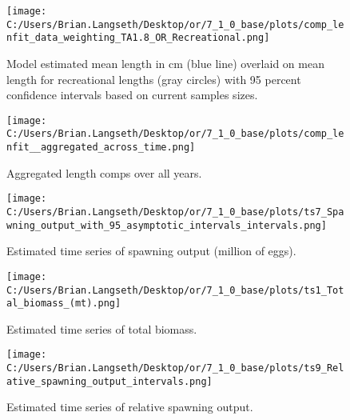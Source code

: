 \documentclass[11pt,
  english,
  a4paper,
]{article}
\begin{document}
\begin{figure}
\centering
\texttt{[image: C:/Users/Brian.Langseth/Desktop/or/7\_1\_0\_base/plots/comp\_lenfit\_data\_weighting\_TA1.8\_OR\_Recreational.png]}
\caption{Model estimated mean length in cm (blue line) overlaid on mean length for recreational lengths (gray circles) with 95 percent confidence intervals based on current samples sizes.\label{fig:rec-mean-len-fit}}
\end{figure}

\tagmcend\tagstructend


\begin{figure}
\centering
\texttt{[image: C:/Users/Brian.Langseth/Desktop/or/7\_1\_0\_base/plots/comp\_lenfit\_\_aggregated\_across\_time.png]}
\caption{Aggregated length comps over all years.\label{fig:agg-len-fit}}
\end{figure}

\tagmcend\tagstructend


\begin{figure}
\centering
\texttt{[image: C:/Users/Brian.Langseth/Desktop/or/7\_1\_0\_base/plots/ts7\_Spawning\_output\_with\_95\_asymptotic\_intervals\_intervals.png]}
\caption{Estimated time series of spawning output (million of eggs).\label{fig:ssb}}
\end{figure}

\tagmcend\tagstructend


\begin{figure}
\centering
\texttt{[image: C:/Users/Brian.Langseth/Desktop/or/7\_1\_0\_base/plots/ts1\_Total\_biomass\_(mt).png]}
\caption{Estimated time series of total biomass.\label{fig:tot-bio}}
\end{figure}

\tagmcend\tagstructend


\begin{figure}
\centering
\texttt{[image: C:/Users/Brian.Langseth/Desktop/or/7\_1\_0\_base/plots/ts9\_Relative\_spawning\_output\_intervals.png]}
\caption{Estimated time series of relative spawning output.\label{fig:depl}}
\end{figure}
\end{document}
